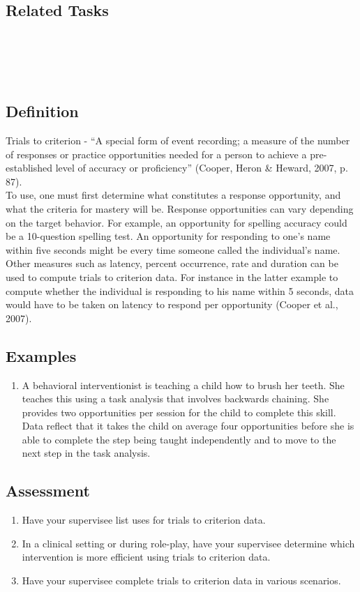 \subsection{Related Tasks}
\fouriOne{}\\
\fourhOne{}\\
\fourFKFourtySeven\\
%
%
%
%
%
%
\section{\fouraSeven{}}
\subsection{Definition}
Trials to criterion - ``A special form of event recording; a measure of the number of responses or practice opportunities needed for a person to achieve a pre-established level of accuracy or proficiency'' (Cooper, Heron \& Heward, 2007, p.  87).\\

To use, one must first determine what constitutes a response opportunity, and what the criteria for mastery will be. Response opportunities can vary depending on the target behavior. For example, an opportunity for spelling accuracy could be a 10-question spelling test. An opportunity for responding to one's name within five seconds might be every time someone called the individual's name. Other measures such as latency, percent occurrence, rate and duration can be used to compute trials to criterion data. For instance in the latter example to compute whether the individual is responding to his name within 5 seconds, data would have to be taken on latency to respond per opportunity (Cooper et al., 2007).\\
%
\subsection{Examples}
\begin{enumerate}
\item A behavioral interventionist is teaching a child how to brush her teeth. She teaches this using a task analysis that involves backwards chaining. She provides two opportunities per session for the child to complete this skill. Data reflect that it takes the child on average four opportunities before she is able to complete the step being taught independently and to move to the next step in the task analysis.
\end{enumerate}
%
\subsection{Assessment}
\begin{enumerate}
\item Have your supervisee list uses for trials to criterion data.
\item In a clinical setting or during role-play, have your supervisee determine which intervention is more efficient using trials to criterion data. 
\item Have your supervisee complete trials to criterion data in various scenarios. 
\end{enumerate}
%
